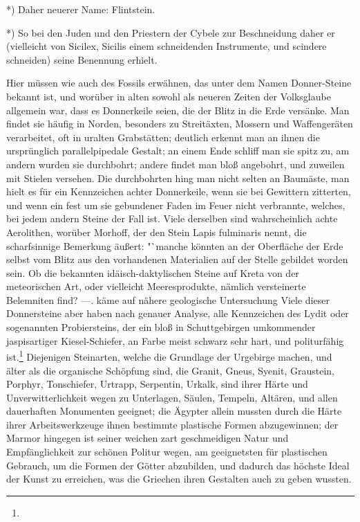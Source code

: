 \documentclass[a4paper, 11pt, oneside, polutonikogreek, german]{article}
\begin{document}
*) Daher neuerer Name: Flintstein.

*) So bei den Juden und den Priestern der Cybele zur Beschneidung daher er (vielleicht von Sicilex, Sicilis einem schneidenden Instrumente, und scindere schneiden) seine Benennung erhielt.

Hier müssen wie auch des Fossils erwähnen, das unter dem Namen Donner-Steine bekannt ist, und worüber in alten sowohl als neueren Zeiten der Volksglaube allgemein war, dass es Donnerkeile seien, die der Blitz in die Erde versänke. Man findet sie häufig in Norden, besonders zu Streitäxten, Mossern und Waffengeräten verarbeitet, oft in uralten Grabstätten; deutlich erkennt man an ihnen die ursprünglich parallelpipedale Gestalt; an einem Ende schliff man sie spitz zu, am andern wurden sie durchbohrt; andere findet man bloß angebohrt, und zuweilen mit Stielen versehen. Die durchbohrten hing man nicht selten an Baumäste, man hielt es für ein Kennzeichen achter Donnerkeile, wenn sie bei Gewittern zitterten, und wenn ein fest um sie gebundener Faden im Feuer nicht verbrannte, welches, bei jedem andern Steine der Fall ist. Viele derselben sind wahrscheinlich achte Aerolithen, worüber Morhoff, der den Stein Lapis fulminaris nennt, die scharfsinnige Bemerkung äußert: "`manche könnten an der Oberfläche der Erde selbst vom Blitz aus den vorhandenen Materialien auf der Stelle gebildet worden sein. Ob die bekannten idäisch-daktylischen Steine auf Kreta von der meteorischen Art, oder vielleicht Meeresprodukte, nämlich versteinerte Belemniten find? ---. käme auf nähere geologische Untersuchung Viele dieser Donnersteine aber haben nach genauer Analyse, alle Kennzeichen des Lydit oder sogenannten Probiersteins, der ein bloß in Schuttgebirgen umkommender jaspisartiger Kiesel-Schiefer, an Farbe meist schwarz sehr hart, und politurfähig ist.\footnote{} Diejenigen Steinarten, welche die Grundlage der Urgebirge machen, und älter als die organische Schöpfung sind, die Granit, Gneus, Syenit, Graustein, Porphyr, Tonschiefer, Urtrapp, Serpentin, Urkalk, sind ihrer Härte und Unverwitterlichkeit wegen zu Unterlagen, Säulen, Tempeln, Altären, und allen dauerhaften Monumenten geeignet; die Ägypter allein mussten durch die Härte ihrer Arbeitswerkzeuge ihnen bestimmte plastische Formen abzugewinnen; der Marmor hingegen ist seiner weichen zart geschmeidigen Natur und Empfänglichkeit zur schönen Politur wegen, am geeignetsten für plastischen Gebrauch, um die Formen der Götter abzubilden, und dadurch das höchste Ideal der Kunst zu erreichen, was die Griechen ihren Gestalten auch zu geben wussten.
\end{document}
